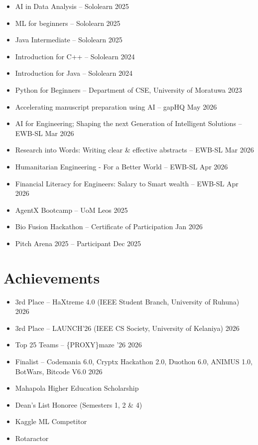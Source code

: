 \documentclass[a4paper,11pt]{article}
\begin{document}
\begin{itemize}
    \item AI in Data Analysis -- Sololearn \hfill 2025
    \item ML for beginners -- Sololearn \hfill 2025
    \item Java Intermediate -- Sololearn \hfill 2025
    \item Introduction for C++ -- Sololearn \hfill 2024
    \item Introduction for Java -- Sololearn \hfill 2024
    \item Python for Beginners -- Department of CSE, University of Moratuwa \hfill 2023
    \item Accelerating manuscript preparation using AI -- gapHQ \hfill May 2026
    \item AI for Engineering; Shaping the next Generation of Intelligent Solutions -- EWB-SL \hfill Mar 2026
    \item Research into Words: Writing clear \& effective abstracts -- EWB-SL \hfill Mar 2026
    \item Humanitarian Engineering - For a Better World -- EWB-SL \hfill Apr 2026
    \item Financial Literacy for Engineers: Salary to Smart wealth -- EWB-SL \hfill Apr 2026
    \item AgentX Bootcamp -- UoM Leos \hfill 2025
    \item Bio Fusion Hackathon -- Certificate of Participation \hfill Jan 2026
    \item Pitch Arena 2025 -- Participant \hfill Dec 2025
\end{itemize}

\section*{Achievements}
\begin{itemize}
    \item 3rd Place -- HaXtreme 4.0 (IEEE Student Branch, University of Ruhuna) \hfill 2026
    \item 3rd Place -- LAUNCH'26 (IEEE CS Society, University of Kelaniya) \hfill 2026
    \item Top 25 Teams -- \{PROXY\}maze '26 \hfill 2026
    \item Finalist -- Codemania 6.0, Cryptx Hackathon 2.0, Duothon 6.0, ANIMUS 1.0, BotWars, Bitcode V6.0 \hfill 2026
    \item Mahapola Higher Education Scholarship
    \item Dean's List Honoree (Semesters 1, 2 \& 4)
    \item Kaggle ML Competitor
    \item Rotaractor
\end{itemize}
\end{document}
